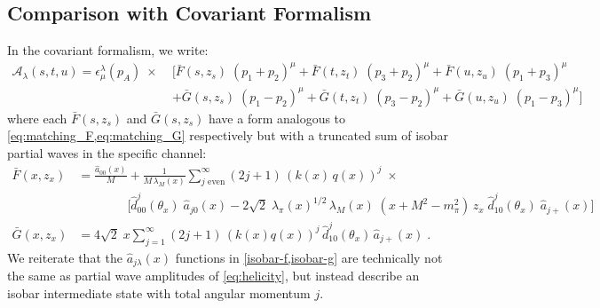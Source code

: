 \documentclass[10pt, aps,prd,amsmath,amssymb,superscriptaddress,onecolumn,
nofootinbib,showpacs,preprintnumbers]{revtex4-1}
\begin{document}
\subsection{Comparison with Covariant Formalism}
%
In the covariant formalism, we write:
  \begin{align}
    \label{eq:covariant-iso-decomp}
    \mathcal{A}_\lambda(s,t,u) = \epsilon_\mu^\lambda(p_A) \; \times \; &\bigg[
     \bar{F}(s,z_s) \; (p_1 + p_2)^\mu
     + \bar{F}(t, z_t) \; (p_3 + p_2)^\mu
      + \bar{F}(u, z_u) \; (p_1 + p_3)^\mu \nonumber \\
    &+\bar{G}(s,z_s) \; (p_1 - p_2)^\mu
    + \bar{G}(t,z_t) \; (p_3 - p_2)^\mu
    + \bar{G}(u,z_u) \; (p_1 - p_3)^\mu \bigg]
  \end{align}
where each \(\bar{F}(s,z_s)\) and \(\bar{G}(s,z_s)\) have a form analogous to \cref{eq:matching_F,eq:matching_G} respectively but with a truncated sum of isobar partial waves in the specific channel:
\begin{subequations}
  \begin{align}
      \bar{F}(x,z_x) &= \frac{\hat{a}_{00}(x)}{M} + \frac{1}{M \, \lambda_M(x)} \sum_{j \text{ even}}^\infty (2j+1) \, (k(x)\,q(x))^{j} \; \times \nonumber \\
           & \qquad \qquad \bigg[ \hat{d}^j_{00}(\theta_x) \; \hat{a}_{j0}(x)
         - 2 \sqrt{2} \; \lambda_\pi(x)^{1/2} \, \lambda_M(x) \; (x + M^2 - m_\pi^2)\,  z_x \; \hat{d}^j_{10}(\theta_x) \; \hat{a}_{j+}(x) \bigg]
      \label{isobar-f} \\
   \bar{G}(x,z_x) &=  4 \sqrt{2} \; x \sum_{j = 1}^\infty (2j+1) \, (k(x)q(x))^{j} \,\hat{d}^j_{10}(\theta_x) \, \hat{a}_{j+}(x) \; . \label{isobar-g}
  \end{align}
\end{subequations}
We reiterate that the \(\hat{a}_{j\lambda}(x)\) functions in \cref{isobar-f,isobar-g} are technically not the same as partial wave amplitudes of \cref{eq:helicity}, but instead describe an isobar intermediate state with total angular momentum \(j\).
\end{document}
